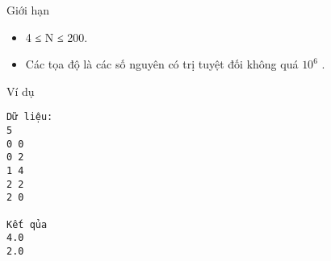 Giới hạn
\begin{itemize}
	\item     4 ≤ N ≤ 200.   
	\item     Các tọa độ là các số nguyên có trị tuyệt đối không quá $10^{6}$    .   
\end{itemize}
Ví dụ
\begin{verbatim}
Dữ liệu:
5
0 0
0 2
1 4
2 2
2 0

Kết qủa
4.0
2.0
\end{verbatim}